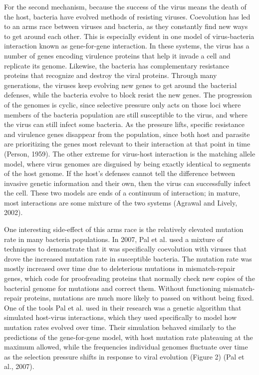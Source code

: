 \documentclass[11pt, oneside]{article}
\begin{document}
For the second mechanism, because the success of the virus means the death of the host, bacteria have evolved methods of resisting viruses. Coevolution has led to an arms race between viruses and bacteria, as they constantly find new ways to get around each other. This is especially evident in one model of virus-bacteria interaction known as gene-for-gene interaction. In these systems, the virus has a number of genes encoding virulence proteins that help it invade a cell and replicate its genome. Likewise, the bacteria has complementary resistance proteins that recognize and destroy the viral proteins. Through many generations, the viruses keep evolving new genes to get around the bacterial defenses, while the bacteria evolve to block resist the new genes. The progression of the genomes is cyclic, since selective pressure only acts on those loci where members of the bacteria population are still susceptible to the virus, and where the virus can still infect some bacteria. As the pressure lifts, specific resistance and virulence genes disappear from the population, since both host and parasite are prioritizing the genes most relevant to their interaction at that point in time (Person, 1959). The other extreme for virus-host interaction is the matching allele model, where virus genomes are disguised by being exactly identical to segments of the host genome. If the host's defenses cannot tell the difference between invasive genetic information and their own, then the virus can successfully infect the cell. These two models are ends of a continuum of interaction; in mature, most interactions are some mixture of the two systems (Agrawal and Lively, 2002).

One interesting side-effect of this arms race is the relatively elevated mutation rate in many bacteria populations. In 2007, Pal et al. used a mixture of techniques to demonstrate that it was specifically coevolution with viruses that drove the increased mutation rate in susceptible bacteria. The mutation rate was mostly increased over time due to deleterious mutations in mismatch-repair genes, which code for proofreading proteins that normally check new copies of the bacterial genome for mutations and correct them. Without functioning mismatch-repair proteins, mutations are much more likely to passed on without being fixed. One of the tools Pal et al. used in their research was a genetic algorithm that simulated host-virus interactions, which they used specifically to model how mutation rates evolved over time. Their simulation behaved similarly to the predictions of the gene-for-gene model, with host mutation rate plateauing at the maximum allowed, while the frequencies individual genomes fluctuate over time as the selection pressure shifts in response to viral evolution (Figure 2) (Pal et al., 2007).
\end{document}
